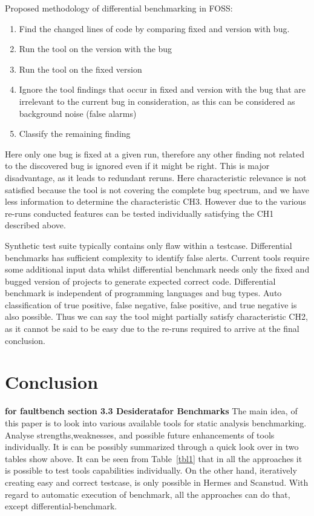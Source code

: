 \documentclass[authoryear,preprint]{sigplanconf}
\begin{document}
Proposed methodology of differential benchmarking in FOSS:
\begin{enumerate}
	\item Find the changed lines of code by comparing fixed and version with bug.
	\item Run the tool on the version with the bug
	\item Run the tool on the fixed version
	\item Ignore the tool findings that occur in fixed and version with the bug that are irrelevant to the current bug in consideration, as this can be considered as background noise (false alarms)
	\item Classify the remaining finding
\end{enumerate}

Here only one bug is fixed at a given run, therefore any other finding not related to the discovered bug is ignored even if it might be right. This is major disadvantage, as it leads to redundant reruns. Here characteristic relevance is not satisfied because the tool is not covering the complete bug spectrum, and we have less information to determine the characteristic CH3. However due to the various re-runs conducted features can be tested individually satisfying the CH1 described above.

Synthetic test suite typically contains only flaw within a testcase. Differential benchmarks has sufficient complexity to identify false alerts. Current tools require some additional input data whilst differential benchmark needs only the fixed and bugged version of projects to generate expected correct code. Differential benchmark is independent of programming languages and bug types. Auto classification of true positive, false negative, false positive, and true negative is also possible. Thus we can say the tool might partially satisfy characteristic CH2, as it cannot be said to be easy due to the re-runs required to arrive at the final conclusion.

\section{Conclusion}
\label{sec:conclusion}

\textbf{for faultbench section 3.3 Desideratafor Benchmarks}
The main idea, of this paper is to look into various available tools for static analysis benchmarking. Analyse strengths,weaknesses, and possible future enhancements of tools individually. It is can be possibly summarized through a quick look over in two tables show above.  
It can be seen from Table~\ref{tbl1} that in all the approaches it is possible to test tools capabilities individually. On the other hand, iteratively creating easy and correct testcase, is only possible in Hermes and Scanstud. With regard to automatic execution of benchmark, all the approaches can do that, except differential-benchmark.
\end{document}
